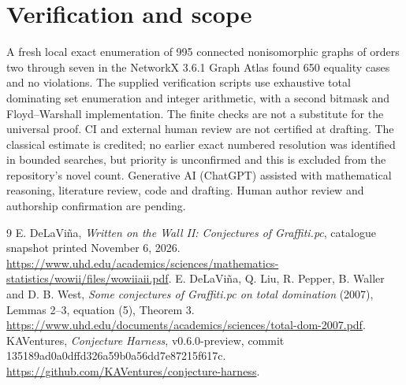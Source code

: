 \documentclass[11pt]{article}
\begin{document}
\section{Verification and scope}
A fresh local exact enumeration of 995 connected nonisomorphic graphs of orders two through seven in the NetworkX 3.6.1 Graph Atlas found 650 equality cases and no violations. The supplied verification scripts use exhaustive total dominating set enumeration and integer arithmetic, with a second bitmask and Floyd--Warshall implementation. The finite checks are not a substitute for the universal proof. CI and external human review are not certified at drafting. The classical estimate is credited; no earlier exact numbered resolution was identified in bounded searches, but priority is unconfirmed and this is excluded from the repository's novel count. Generative AI (ChatGPT) assisted with mathematical reasoning, literature review, code and drafting. Human author review and authorship confirmation are pending.
\begin{thebibliography}{9}
 E. DeLaVi\~na, \emph{Written on the Wall II: Conjectures of Graffiti.pc}, catalogue snapshot printed November 6, 2026. \url{https://www.uhd.edu/academics/sciences/mathematics-statistics/wowii/files/wowiiaii.pdf}.
 E. DeLaVi\~na, Q. Liu, R. Pepper, B. Waller and D. B. West, \emph{Some conjectures of Graffiti.pc on total domination} (2007), Lemmas 2--3, equation (5), Theorem 3. \url{https://www.uhd.edu/documents/academics/sciences/total-dom-2007.pdf}.
 KAVentures, \emph{Conjecture Harness}, v0.6.0-preview, commit 135189ad0a0dffd326a59b0a56dd7e87215f617c. \url{https://github.com/KAVentures/conjecture-harness}.
\end{thebibliography}
\end{document}
